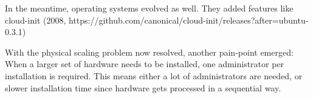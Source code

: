 In the meantime, operating systems evolved as well. They added features like cloud-init (2008, https://github.com/canonical/cloud-init/releases?after=ubuntu-0.3.1)


With the physical scaling problem now resolved, another pain-point emerged: When a larger set of hardware needs to be installed, one administrator per installation is required. This means either a lot of administrators are needed, or slower installation time since hardware gets processed in a sequential way.






